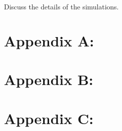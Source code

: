 \documentclass[11pt,one column]{article}
\begin{document}
\begin{multicols}{2}
Discuss the details of the simulations.



\end{multicols}

\newpage

\section*{Appendix A:}
\section*{Appendix B:}
\section*{Appendix C:}
\end{document}
